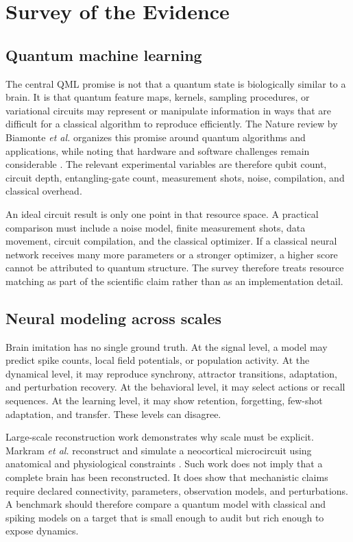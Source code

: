 \documentclass[conference]{IEEEtran}
\begin{document}
\section{Survey of the Evidence}
\label{sec:survey}

\subsection{Quantum machine learning}

The central QML promise is not that a quantum state is biologically similar to a brain.
It is that quantum feature maps, kernels, sampling procedures, or variational circuits
may represent or manipulate information in ways that are difficult for a classical
algorithm to reproduce efficiently. The Nature review by Biamonte \emph{et al.}
organizes this promise around quantum algorithms and applications, while noting that
hardware and software challenges remain considerable \cite{biamonte2017}. The relevant
experimental variables are therefore qubit count, circuit depth, entangling-gate count,
measurement shots, noise, compilation, and classical overhead.

An ideal circuit result is only one point in that resource space. A practical comparison
must include a noise model, finite measurement shots, data movement, circuit compilation,
and the classical optimizer. If a classical neural network receives many more parameters
or a stronger optimizer, a higher score cannot be attributed to quantum structure. The
survey therefore treats resource matching as part of the scientific claim rather than
as an implementation detail.

\subsection{Neural modeling across scales}

Brain imitation has no single ground truth. At the signal level, a model may predict
spike counts, local field potentials, or population activity. At the dynamical level,
it may reproduce synchrony, attractor transitions, adaptation, and perturbation
recovery. At the behavioral level, it may select actions or recall sequences. At the
learning level, it may show retention, forgetting, few-shot adaptation, and transfer.
These levels can disagree.

Large-scale reconstruction work demonstrates why scale must be explicit. Markram
\emph{et al.} reconstruct and simulate a neocortical microcircuit using anatomical and
physiological constraints \cite{markram2015}. Such work does not imply that a complete
brain has been reconstructed. It does show that mechanistic claims require declared
connectivity, parameters, observation models, and perturbations. A benchmark should
therefore compare a quantum model with classical and spiking models on a target that is
small enough to audit but rich enough to expose dynamics.
\end{document}
